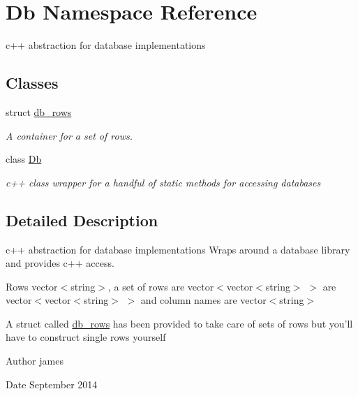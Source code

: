 \hypertarget{namespaceDb}{\section{Db Namespace Reference}
\label{namespaceDb}
}


c++ abstraction for database implementations  


\subsection*{Classes}
\begin{DoxyCompactItemize}
\item 
struct \hyperlink{structDb_1_1db__rows}{db\-\_\-rows}
\begin{DoxyCompactList}\small\item\em A container for a set of rows. \end{DoxyCompactList}\item 
class \hyperlink{classDb_1_1Db}{Db}
\begin{DoxyCompactList}\small\item\em c++ class wrapper for a handful of static methods for accessing databases \end{DoxyCompactList}\end{DoxyCompactItemize}


\subsection{Detailed Description}
c++ abstraction for database implementations Wraps around a database library and provides c++ access.

Rows vector$<$string$>$, a set of rows are vector$<$vector$<$string$>$ $>$ are vector$<$vector$<$string$>$ $>$ and column names are vector$<$string$>$

A struct called \hyperlink{structDb_1_1db__rows}{db\-\_\-rows} has been provided to take care of sets of rows but you'll have to construct single rows yourself \begin{DoxyAuthor}{Author}
james 
\end{DoxyAuthor}
\begin{DoxyDate}{Date}
September 2014 
\end{DoxyDate}
